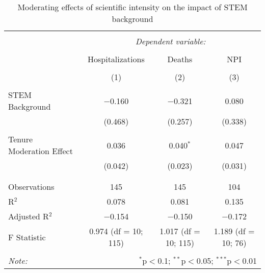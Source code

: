 
\begin{table}[!htbp] \centering 
  \caption{Moderating effects of scientific intensity on the impact of STEM background} 
  \label{} 
\begin{tabular}{@{\extracolsep{5pt}}lccc} 
\\[-1.8ex]\hline 
\hline \\[-1.8ex] 
 & \multicolumn{3}{c}{\textit{Dependent variable:}} \\ 
\cline{2-4} 
\\[-1.8ex] & Hospitalizations & Deaths & NPI \\ 
\\[-1.8ex] & (1) & (2) & (3)\\ 
\hline \\[-1.8ex] 
 STEM Background & $-$0.160 & $-$0.321 & 0.080 \\ 
  & (0.468) & (0.257) & (0.338) \\ 
  & & & \\ 
 Tenure Moderation Effect & 0.036 & 0.040$^{*}$ & 0.047 \\ 
  & (0.042) & (0.023) & (0.031) \\ 
  & & & \\ 
\hline \\[-1.8ex] 
Observations & 145 & 145 & 104 \\ 
R$^{2}$ & 0.078 & 0.081 & 0.135 \\ 
Adjusted R$^{2}$ & $-$0.154 & $-$0.150 & $-$0.172 \\ 
F Statistic & 0.974 (df = 10; 115) & 1.017 (df = 10; 115) & 1.189 (df = 10; 76) \\ 
\hline 
\hline \\[-1.8ex] 
\textit{Note:}  & \multicolumn{3}{r}{$^{*}$p$<$0.1; $^{**}$p$<$0.05; $^{***}$p$<$0.01} \\ 
\end{tabular} 
\end{table} 
